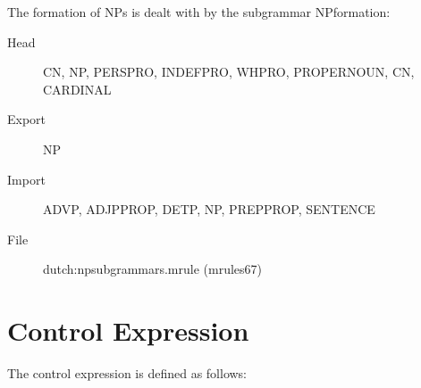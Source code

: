 The formation of NPs is dealt with by 
the subgrammar NPformation:\\
\begin{description}
  \item[Head] CN, NP, PERSPRO, INDEFPRO, WHPRO, PROPERNOUN, CN, CARDINAL 
  \item[Export] NP
  \item[Import] ADVP, ADJPPROP, DETP, NP, PREPPROP, SENTENCE
%
  \item[File] dutch:npsubgrammars.mrule (mrules67)
\end{description}

\section{Control Expression}
The control expression is defined as follows:

